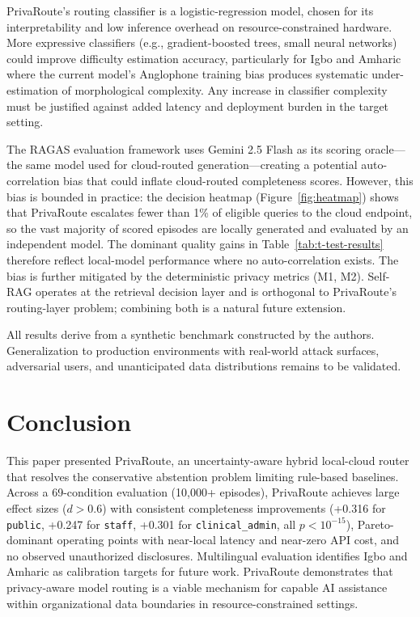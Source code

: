 \documentclass{article}
\newcommand{\code}[1]{{\small\texttt{#1}}}
\begin{document}
PrivaRoute's routing classifier is a logistic-regression model, chosen for its interpretability and low inference overhead on resource-constrained hardware. More expressive classifiers (e.g., gradient-boosted trees, small neural networks) could improve difficulty estimation accuracy, particularly for Igbo and Amharic where the current model's Anglophone training bias produces systematic under-estimation of morphological complexity. Any increase in classifier complexity must be justified against added latency and deployment burden in the target setting.

The RAGAS evaluation framework uses Gemini 2.5 Flash as its scoring oracle---the same model used for cloud-routed generation---creating a potential auto-correlation bias that could inflate cloud-routed completeness scores. However, this bias is bounded in practice: the decision heatmap (Figure~\ref{fig:heatmap}) shows that PrivaRoute escalates fewer than 1\% of eligible queries to the cloud endpoint, so the vast majority of scored episodes are locally generated and evaluated by an independent model. The dominant quality gains in Table~\ref{tab:t-test-results} therefore reflect local-model performance where no auto-correlation exists. The bias is further mitigated by the deterministic privacy metrics (M1, M2). Self-RAG \cite{asai2024selfrag} operates at the retrieval decision layer and is orthogonal to PrivaRoute's routing-layer problem; combining both is a natural future extension.

All results derive from a synthetic benchmark constructed by the authors. Generalization to production environments with real-world attack surfaces, adversarial users, and unanticipated data distributions remains to be validated.

\section{Conclusion}

This paper presented PrivaRoute, an uncertainty-aware hybrid local-cloud router that resolves the conservative abstention problem limiting rule-based baselines. Across a 69-condition evaluation (10,000+ episodes), PrivaRoute achieves large effect sizes ($d > 0.6$) with consistent completeness improvements (+0.316 for \code{public}, +0.247 for \code{staff}, +0.301 for \code{clinical\_admin}, all $p < 10^{-15}$), Pareto-dominant operating points with near-local latency and near-zero API cost, and no observed unauthorized disclosures. Multilingual evaluation identifies Igbo and Amharic as calibration targets for future work. PrivaRoute demonstrates that privacy-aware model routing is a viable mechanism for capable AI assistance within organizational data boundaries in resource-constrained settings.
\end{document}
